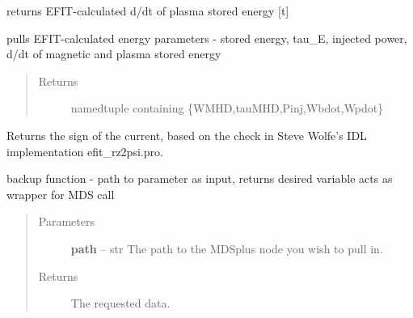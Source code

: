 \documentclass[letterpaper,10pt,english]{sphinxmanual}
\begin{document}
\begin{fulllineitems}

\begin{fulllineitems}
\label{eqtools:eqtools.EFIT.EFITTree.getWpdot}
returns EFIT-calculated d/dt of plasma stored energy {[}t{]}

\end{fulllineitems}


\begin{fulllineitems}
\label{eqtools:eqtools.EFIT.EFITTree.getEnergy}
pulls EFIT-calculated energy parameters - stored energy, tau\_E, injected power, d/dt of magnetic and plasma stored energy
\begin{quote}\begin{description}
\item[{Returns}] \leavevmode
namedtuple containing \{WMHD,tauMHD,Pinj,Wbdot,Wpdot\}

\end{description}\end{quote}

\end{fulllineitems}


\begin{fulllineitems}
\label{eqtools:eqtools.EFIT.EFITTree.getCurrentSign}
Returns the sign of the current, based on the check in Steve Wolfe's IDL implementation efit\_rz2psi.pro.

\end{fulllineitems}


\begin{fulllineitems}
\label{eqtools:eqtools.EFIT.EFITTree.getParam}
backup function - path to parameter as input, returns desired variable acts as wrapper for MDS call
\begin{quote}\begin{description}
\item[{Parameters }] \leavevmode
\textbf{path} --
str
The path to the MDSplus node you wish to pull in.

\item[{Returns}] \leavevmode
The requested data.

\end{description}\end{quote}

\end{fulllineitems}


\end{fulllineitems}
\end{document}
